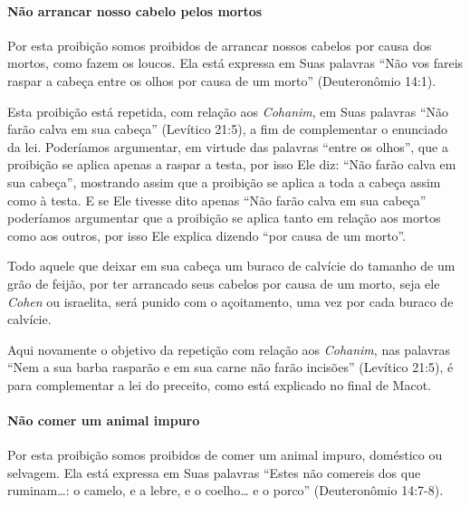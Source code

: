 \paragraph{Não arrancar nosso cabelo pelos mortos}

Por esta proibição somos proibidos de arrancar nossos cabelos por causa
dos mortos, como fazem os loucos. Ela está expressa em Suas palavras
``Não vos fareis raspar a cabeça entre os olhos por causa de um morto''
(Deuteronômio 14:1).

Esta proibição está repetida, com relação aos \textit{Cohanim}, em Suas
palavras ``Não farão calva em sua cabeça'' (Levítico 21:5), a fim de
complementar o enunciado da lei. Poderíamos argumentar, em virtude das
palavras ``entre os olhos'', que a proibição se aplica apenas a raspar a
testa, por isso Ele diz: ``Não farão calva em sua cabeça'', mostrando
assim que a proibição se aplica a toda a cabeça assim como à testa. E se
Ele tivesse dito apenas ``Não farão calva em sua cabeça'' poderíamos
argumentar que a proibição se aplica tanto em relação aos mortos como
aos outros, por isso Ele explica dizendo ``por causa de um morto''.

Todo aquele que deixar em sua cabeça um buraco de calvície do tamanho de
um grão de feijão, por ter arrancado seus cabelos por causa de um morto,
seja ele \textit{Cohen} ou israelita, será punido com o açoitamento, uma vez
por cada buraco de calvície.

Aqui novamente o objetivo da repetição com relação aos \textit{Cohanim}, nas
palavras ``Nem a sua barba rasparão e em sua carne não farão incisões''
(Levítico 21:5), é para complementar a lei do preceito, como está
explicado no final de Macot.

\paragraph{Não comer um animal impuro}

Por esta proibição somos proibidos de comer um animal impuro, doméstico
ou selvagem. Ela está expressa em Suas palavras ``Estes não comereis
dos que ruminam\ldots{}: o camelo, e a lebre, e o coelho\ldots{} e o porco''
(Deuteronômio 14:7-8).

